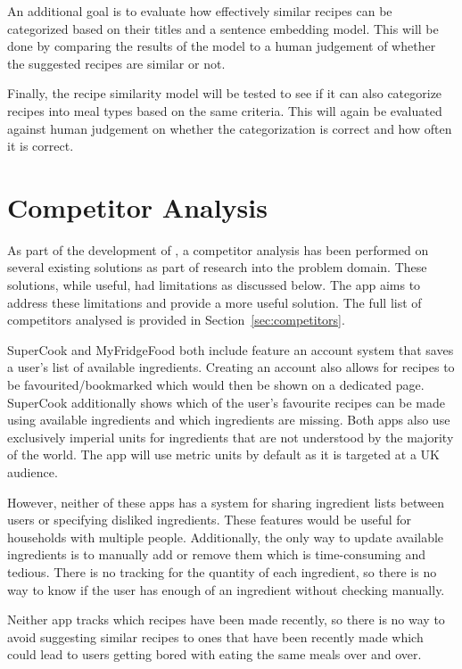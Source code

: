 An additional goal is to evaluate how effectively similar recipes can be categorized based on their titles
and a sentence embedding model. This will be done by comparing the results of the model to a human judgement
of whether the suggested recipes are similar or not.

Finally, the recipe similarity model will be tested to see if it can also categorize recipes into meal types
based on the same criteria. This will again be evaluated against human judgement on whether the categorization
is correct and how often it is correct.

\section{Competitor Analysis}\label{sec:competitor_analysis}

As part of the development of \chef{}, a competitor analysis has been performed on several existing solutions as part of research
into the problem domain. These solutions, while useful, had limitations as discussed below. The \chef{} app aims to address
these limitations and provide a more useful solution. The full list of competitors analysed is provided in Section~\ref{sec:competitors}.

SuperCook and MyFridgeFood both include feature an account system
that saves a user's list of available ingredients. Creating an account also allows for recipes to be favourited/bookmarked
which would then be shown on a dedicated page. SuperCook additionally shows which of the user's favourite recipes
can be made using available ingredients and which ingredients are missing. Both apps also use exclusively imperial
units for ingredients that are not understood by the majority of the world. The \chef{} app will use metric units by default
as it is targeted at a UK audience.

However, neither of these apps has a system for sharing ingredient lists between users or specifying disliked ingredients. These features would be useful for households with multiple people.
Additionally, the only way to update available ingredients is to manually add or remove them which is time-consuming and tedious. There is no tracking for the quantity of
each ingredient, so there is no way to know if the user has enough of an ingredient without checking manually.

Neither app tracks which recipes have been made recently, so there is no way to avoid suggesting similar recipes to ones that have been recently made which could lead to
users getting bored with eating the same meals over and over.


